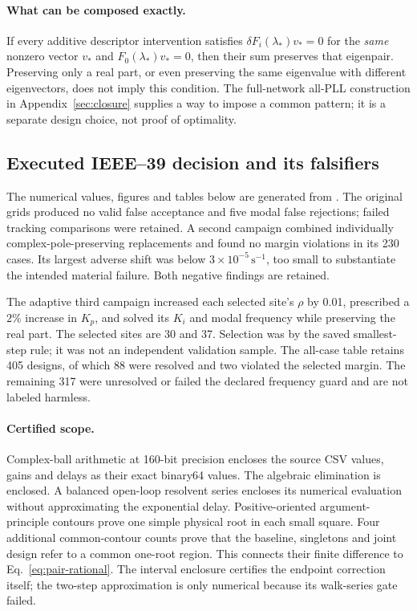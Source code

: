 \paragraph{What can be composed exactly.}
If every additive descriptor intervention satisfies
$\delta F_i(\lambda_*)v_*=0$ for the \emph{same} nonzero vector $v_*$ and
$F_0(\lambda_*)v_*=0$, then their sum preserves that eigenpair.
Preserving only a real part, or even preserving the same eigenvalue with
different eigenvectors, does not imply this condition. The full-network
all-PLL construction in Appendix~\ref{sec:closure} supplies a way to impose
a common pattern; it is a separate design choice, not proof of optimality.

\subsection{Executed IEEE--39 decision and its falsifiers}
The numerical values, figures and tables below are generated from
.
The original grids produced no valid false acceptance and five modal false
rejections; failed tracking comparisons were retained. A second campaign
combined individually complex-pole-preserving replacements and found no
margin violations in its 230 cases. Its largest adverse shift was below
$3\times10^{-5}\,\mathrm{s}^{-1}$, too small to substantiate the intended
material failure. Both negative findings are retained.

The adaptive third campaign increased each selected site's $\rho$ by 0.01,
prescribed a $2\%$ increase in $K_p$, and solved its $K_i$ and modal frequency
while preserving the real part. The selected sites are 30 and 37. Selection
was by the saved smallest-step rule; it was not an independent validation
sample. The all-case table retains 405 designs, of which 88 were resolved
and two violated the selected margin. The remaining 317 were unresolved
or failed the declared frequency guard and are not labeled harmless.


\paragraph{Certified scope.}
Complex-ball arithmetic at 160-bit precision encloses the source CSV values,
gains and delays as their exact binary64 values. The algebraic elimination
is enclosed. A balanced open-loop resolvent series encloses its numerical
evaluation without approximating the exponential delay. Positive-oriented
argument-principle contours prove one simple physical root in each small
square. Four additional common-contour counts prove that the baseline,
singletons and joint design refer to a common one-root region. This connects
their finite difference to Eq.~\eqref{eq:pair-rational}.
The interval enclosure certifies the endpoint correction itself; the
two-step approximation is only numerical because its walk-series gate failed.


